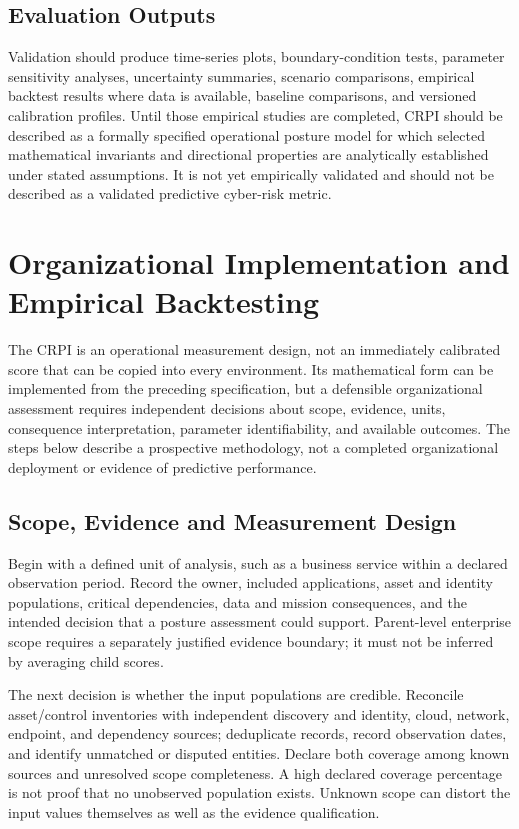 \documentclass[11pt]{article}
\begin{document}
\subsection{Evaluation Outputs}
Validation should produce time-series plots, boundary-condition tests, parameter
sensitivity analyses, uncertainty summaries, scenario comparisons, empirical backtest
results where data is available, baseline comparisons, and versioned calibration
profiles. Until those empirical studies are completed, CRPI should be described as a
formally specified operational posture model for which selected mathematical invariants
and directional properties are analytically established under stated assumptions. It is
not yet empirically validated and should not be described as a validated predictive
cyber-risk metric.


\section{Organizational Implementation and Empirical Backtesting}
\label{sec:implementation}
The CRPI is an operational measurement design, not an immediately
calibrated score that can be copied into every environment. Its
mathematical form can be implemented from the preceding specification,
but a defensible organizational assessment requires independent
decisions about scope, evidence, units, consequence interpretation,
parameter identifiability, and available outcomes. The steps below
describe a prospective methodology, not a completed organizational
deployment or evidence of predictive performance.

\subsection{Scope, Evidence and Measurement Design}
Begin with a defined unit of analysis, such as a business service
within a declared observation period. Record the owner, included
applications, asset and identity populations, critical dependencies,
data and mission consequences, and the intended decision that a
posture assessment could support. Parent-level enterprise scope
requires a separately justified evidence boundary; it must not be
inferred by averaging child scores.

The next decision is whether the input populations are credible.
Reconcile asset/control inventories with independent discovery
and identity, cloud, network, endpoint, and dependency sources;
deduplicate records, record observation dates, and identify
unmatched or disputed entities. Declare both coverage among
known sources and unresolved scope completeness. A
high declared coverage percentage is not proof that no
unobserved population exists. Unknown scope can distort the
input values themselves as well as the evidence qualification.
\end{document}
